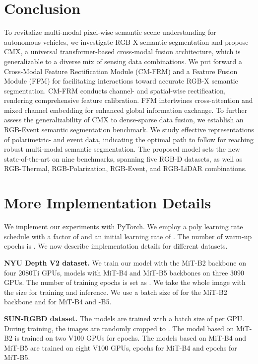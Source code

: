 \documentclass[journal]{IEEEtran}
\begin{document}
\section{Conclusion}
To revitalize multi-modal pixel-wise semantic scene understanding for autonomous vehicles, we investigate RGB-X semantic segmentation and propose CMX, a universal transformer-based cross-modal fusion architecture, which is generalizable to a diverse mix of sensing data combinations.
We put forward a Cross-Modal Feature Rectification Module (CM-FRM) and a Feature Fusion Module (FFM) for facilitating interactions toward accurate RGB-X semantic segmentation.
CM-FRM conducts channel- and spatial-wise rectification, rendering comprehensive feature calibration.
FFM intertwines cross-attention and mixed channel embedding for enhanced global information exchange.
To further assess the generalizability of CMX to dense-sparse data fusion, we establish an RGB-Event semantic segmentation benchmark.
We study effective representations of polarimetric- and event data, indicating the optimal path to follow for reaching robust multi-modal semantic segmentation.
The proposed model sets the new state-of-the-art on nine benchmarks, spanning five RGB-D datasets, as well as RGB-Thermal, RGB-Polarization, RGB-Event, and RGB-LiDAR combinations.




\clearpage

\appendices
{}
\section{More Implementation Details}
\label{sec:more_implementation_details}
We implement our experiments with PyTorch. We employ a poly learning rate schedule with a factor of  and an initial learning rate of . The number of warm-up epochs is .
We now describe implementation details for different datasets.

\noindent\textbf{NYU Depth V2 dataset.} We train our model with the MiT-B2 backbone on four 2080Ti GPUs, models with MiT-B4 and MiT-B5 backbones on three 3090 GPUs. The number of training epochs is set as . We take the whole image with the size  for training and inference. We use a batch size of  for the MiT-B2 backbone and  for MiT-B4 and -B5.

\noindent\textbf{SUN-RGBD dataset.}
The models are trained with a batch size of  per GPU.
During training, the images are randomly cropped to .
The model based on MiT-B2 is trained on two V100 GPUs for  epochs. The models based on MiT-B4 and MiT-B5 are trained on eight V100 GPUs,  epochs for MiT-B4 and  epochs for MiT-B5.
\end{document}
